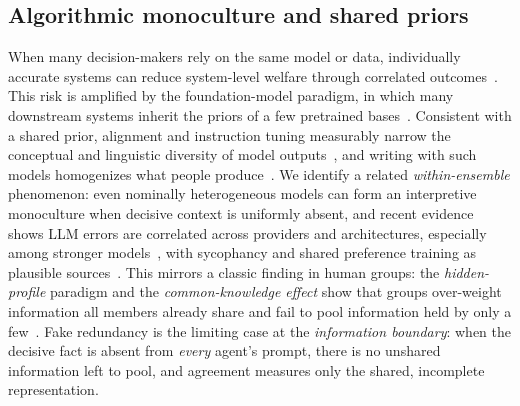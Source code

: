 \documentclass[acmsmall,screen,review,anonymous]{acmart}
\begin{document}
\subsection{Algorithmic monoculture and shared priors}
When many decision-makers rely on the same model or data, individually accurate systems can reduce
system-level welfare through correlated outcomes~\cite{kleinberg2021monoculture}. This risk is amplified by
the foundation-model paradigm, in which many downstream systems inherit the priors of a few pretrained
bases~\cite{bommasani2021foundation}. Consistent with a shared prior, alignment and instruction tuning
measurably narrow the conceptual and linguistic diversity of model outputs~\cite{murthy2025alignment,
guo2025diversity}, and writing with such models homogenizes what people produce~\cite{padmakumar2024writing}.
We identify a related \emph{within-ensemble} phenomenon: even nominally heterogeneous models can form an
interpretive monoculture when decisive context is uniformly absent, and recent evidence shows LLM errors are
correlated across providers and architectures, especially among stronger models~\cite{kim2025correlated},
with sycophancy and shared preference training as plausible sources~\cite{perez2022,sharma2024}.
This mirrors a classic finding in human groups: the \emph{hidden-profile} paradigm and the
\emph{common-knowledge effect} show that groups over-weight information all members already share and fail
to pool information held by only a few~\cite{stasser1985hidden,gigone1993common}. Fake redundancy is the
limiting case at the \emph{information boundary}: when the decisive fact is absent from \emph{every} agent's
prompt, there is no unshared information left to pool, and agreement measures only the shared, incomplete
representation.
\end{document}
